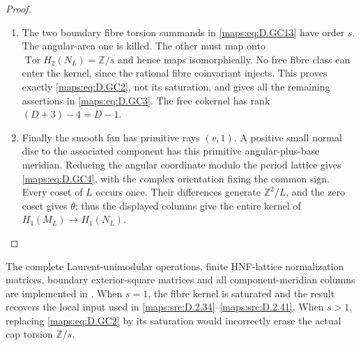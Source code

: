 \begin{proof}
\begin{enumerate}[label=\arabic*.,leftmargin=*]
\item The two boundary fibre torsion summands in
\eqref{maps:eq:D.GC13} have order $s$. The angular-area
one is killed. The other must map onto
$\operatorname{Tor}H_2(N_L)=\mathbb Z/s$ and
hence maps isomorphically. No free fibre
class can enter the kernel, since the rational
fibre coinvariant injects. This proves exactly
\eqref{maps:eq:D.GC2}, not its saturation, and gives all
the remaining assertions in \eqref{maps:eq:D.GC3}.
The free cokernel has rank $(D+3)-4=D-1$.

\item Finally the smooth fan has primitive rays
$(v,1)$. A positive small normal disc to
the associated component has this primitive
angular-plus-base meridian. Reducing the
angular coordinate modulo the period lattice
gives \eqref{maps:eq:D.GC4}, with the complex orientation
fixing the common sign. Every coset of $L$
occurs once. Their differences generate
$\mathbb Z^2/L$, and the zero coset gives
$\theta$; thus the displayed columns give
the entire kernel of $H_1(M_L)\to H_1(N_L)$.
\end{enumerate}
\end{proof}

The complete Laurent-unimodular operations,
finite HNF-lattice normalization matrices,
boundary exterior-square matrices and all
component-meridian columns are implemented in
.
When $s=1$, the fibre kernel is saturated
and the result recovers the local input used
in \ref{maps:src:D.2.34}--\ref{maps:src:D.2.41}. When $s>1$, replacing \eqref{maps:eq:D.GC2}
by its saturation would incorrectly erase
the actual cap torsion $\mathbb Z/s$.


